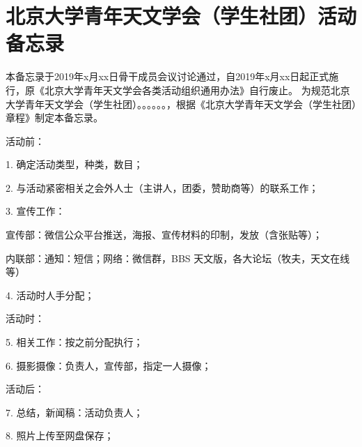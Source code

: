 \chapter{北京大学青年天文学会（学生社团）活动备忘录}

本备忘录于2019年x月xx日骨干成员会议讨论通过，自2019年x月xx日起正式施行，原《北京大学青年天文学会各类活动组织通用办法》自行废止。
为规范北京大学青年天文学会（学生社团）。。。。。。，根据《北京大学青年天文学会（学生社团）章程》制定本备忘录。

活动前：

1. 确定活动类型，种类，数目；

2. 与活动紧密相关之会外人士（主讲人，团委，赞助商等）的联系工作；

3. 宣传工作：

宣传部：微信公众平台推送，海报、宣传材料的印制，发放（含张贴等）；

内联部：通知：短信；网络：微信群，BBS 天文版，各大论坛（牧夫，天文在线等）

4. 活动时人手分配；

活动时：

5. 相关工作：按之前分配执行；

6. 摄影摄像：负责人，宣传部，指定一人摄像；

活动后：

7. 总结，新闻稿：活动负责人；

8. 照片上传至网盘保存；
